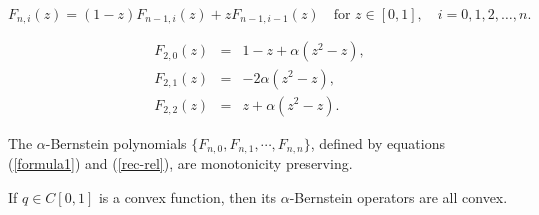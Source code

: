 \documentclass[10pt,a4paper]{amsart}
\begin{document}
  \begin{equation}
F_{n,i}(z) = (1-z)F_{n-1,i}(z) + zF_{n-1,i-1}(z) \quad \text{for } z \in [0,1], \quad i = 0, 1, 2, \ldots, n. \label{rec-rel}
\end{equation}

\begin{eqnarray} 
F_{2,0}(z)&=&1-z+\alpha \left ( z^{2}-z \right ),\nonumber \\
F_{2,1}(z)&=&-2\alpha \left ( z^{2}-z \right ), \label{formula1}\\
F_{2,2}(z)&=&z+\alpha \left ( z^{2}-z \right ).\nonumber
\end{eqnarray} 

\begin{prop}\label{pro3.2}
The $\alpha$-Bernstein polynomials $\{F_{n,0}, F_{n,1}, \cdots, F_{n,n}\}$, defined by equations (\ref{formula1}) and (\ref{rec-rel}),  are  monotonicity preserving.
\end{prop}

\begin{theorem}
 If $q \in C[0,1] $ is a convex function, then    its $\alpha$-Bernstein operators are all convex.
 
\end{theorem}
\end{document}
